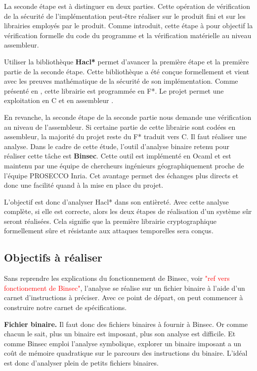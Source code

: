 La seconde étape est à distinguer en deux parties. Cette opération de vérification de la sécurité de l'implémentation peut-être réaliser sur le produit fini et sur les librairies employés par le produit. Comme introduit, cette étape à pour objectif la vérification formelle du code du programme et la vérification matérielle au niveau assembleur.\medbreak

Utiliser la bibliothèque \textbf{Hacl*} \cite{polubelova2020haclxn, Hacl*} permet d'avancer la première étape et la première partie de la seconde étape. Cette bibliothèque a été conçue formellement et vient avec les preuves mathématique de la sécurité de son implémentation. Comme présenté en , cette librairie est programmée en F*. Le projet permet une exploitation en C et en assembleur \cite{Hacl*}.\medbreak

En revanche, la seconde étape de la seconde partie nous demande une vérification au niveau de l'assembleur. Si certaine partie de cette librairie sont codées en assembleur, la majorité du projet reste du F* traduit vers C. Il faut réaliser une analyse. Dans le cadre de cette étude, l'outil d'analyse binaire retenu pour réaliser cette tâche est \textbf{Binsec}. Cette outil est implémenté en Ocaml et est maintenu par une équipe de chercheurs ingénieurs géographiquement proche de l'équipe PROSECCO Inria. Cet avantage permet des échanges plus directs et donc une facilité quand à la mise en place du projet.\medbreak

L'objectif est donc d'analyser Hacl* dans son entièreté. Avec cette analyse complète, si elle est correcte, alors les deux étapes de réalisation d'un système sûr seront réalisées. Cela signifie que la première librairie cryptographique formellement sûre et résistante aux attaques temporelles sera conçus.

\subsection*{Objectifs à réaliser}

Sans reprendre les explications du fonctionnement de Binsec, voir \textcolor{red}{"ref vers fonctionement de Binsec"}, l'analyse se réalise sur un fichier binaire à l'aide d'un carnet d'instructions à préciser. Avec ce point de départ, on peut commencer à construire notre carnet de spécifications.

\textbf{Fichier binaire.} Il faut donc des fichiers binaires à fournir à Binsec. Or comme chacun le sait, plus un binaire est imposant, plus son analyse est difficile. Et comme Binsec emploi l'analyse symbolique, explorer un binaire imposant a un coût de mémoire quadratique sur le parcours des instructions du binaire. L'idéal est donc d'analyser plein de petits fichiers binaires.\smallbreak


